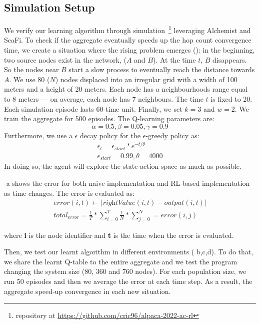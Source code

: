 \documentclass[conference]{IEEEtran}
\begin{document}
\subsection{Simulation Setup}
We verify our learning algorithm through simulation~\footnote{repository at \url{https://github.com/cric96/alpaca-2022-ac-rl}} leveraging Alchemist and ScaFi.
 To check if the aggregate eventually speeds up the hop count convergence time, we create a situation where the rising problem emerges ():
 in the beginning, two source nodes exist in the network, ($A$ and $B$).
 At the time $t$, $B$ disappears. So the nodes near $B$ start a slow process
 to eventually reach the distance towards $A$.
We use 80 ($N$) nodes displaced into an irregular grid with a width of 100 meters and a height of 20 meters. 
 Each node has a neighbourhoods range equal to 8 meters --- on average, each node has 7 neighbours. 
 The time $t$ is fixed to 20.
 Each simulation episode lasts 60-time unit. Finally, we set $k = 3$ and $w = 2$.
% 
We train the aggregate for 500 episodes.
 The Q-learning parameters are:
$$ 
\alpha = 0.5,
\beta = 0.05,
\gamma = 0.9
$$
Furthermore, we use a $\epsilon$ decay policy for the $\epsilon$-greedy policy as:
\begin{equation*}
  \begin{array}{l}
    \epsilon_t = \epsilon_{start} * e^{-t/\theta}\\ 
    \epsilon_{start }= 0.99, \theta=4000
  \end{array}
\end{equation*}
In doing so, the agent will explore the state-action space as much as possible.

-a shows the error for both naive implementation and RL-based implementation as time changes.
The error is evaluated as:
\begin{equation*}
  \begin{array}{l}
    error(i, t) \leftarrow  | \textit{rightValue}(i,t) - \textit{output}(i,t) | \\
    total_{error} = \frac{1}{T} * \sum_{i = 0}^T \frac{1}{N} * \sum_{j = 0}^N = error(i, j)
  \end{array}
\end{equation*}

where \textbf{i} is the node identifier and \textbf{t} is the time when the error is evaluated.

Then, we test our learnt algorithm in different environments ( b,c,d). To do that, we share the learnt Q-table to the 
 entire aggregate and we test the program changing the system size (80, 360 and 760 nodes).
%
For each population size, we run 50 episodes and then we average the error at each time step. 
 As a result, the aggregate speed-up convergence in each new situation.
\end{document}
